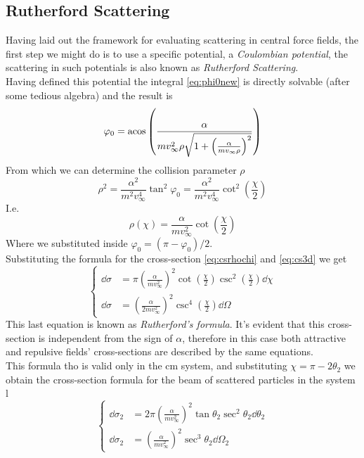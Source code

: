 \documentclass[../admech.tex]{subfiles}
\begin{document}
\subsection{Rutherford Scattering}
Having laid out the framework for evaluating scattering in central force fields, the first step we might do is to use a specific potential, a \emph{Coulombian potential}, the scattering in such potentials is also known as \emph{Rutherford Scattering}.\\
Having defined this potential the integral \eqref{eq:phi0new} is directly solvable (after some tedious algebra) and the result is
\begin{equation}
	\varphi_0=\acos\left( \frac{\alpha}{mv_\infty^2\rho\sqrt{1+\left( \frac{\alpha}{mv_\infty\rho} \right)^2}} \right)
	\label{eq:phi0ruth}
\end{equation}
From which we can determine the collision parameter $\rho$
\begin{equation*}
	\rho^2=\frac{\alpha^2}{m^2v_\infty^4}\tan^2\varphi_0=\frac{\alpha^2}{m^2v_\infty^4}\cot^2\left( \frac{\chi}{2} \right)
\end{equation*}
I.e.
\begin{equation*}
	\rho(\chi)=\frac{\alpha}{mv_\infty^2}\cot\left( \frac{\chi}{2} \right)
	\label{eq:rhoruth}
\end{equation*}
Where we substituted inside $\varphi_0=(\pi-\varphi_0)/2$.\\
Substituting the formula for the cross-section \eqref{eq:csrhochi} and \eqref{eq:cs3d} we get
\begin{equation}
	\left\{ \begin{aligned}
			\dd\sigma&=\pi\left( \frac{\alpha}{mv_\infty^2} \right)^2\cot\left( \frac{\chi}{2} \right)\csc^2\left( \frac{\chi}{2} \right)\dd\chi\\
			\dd\sigma&=\left( \frac{\alpha}{2mv_\infty^2} \right)^2\csc^4\left( \frac{\chi}{2} \right)\dd\Omega
	\end{aligned}\right.
	\label{eq:rutherfordformula}
\end{equation}
This last equation is known as \emph{Rutherford's formula}. It's evident that this cross-section is independent from the sign of $\alpha$, therefore in this case both attractive and repulsive fields' cross-sections are described by the same equations.\\
This formula tho is valid only in the cm system, and substituting $\chi=\pi-2\theta_2$ we obtain the cross-section formula for the beam of scattered particles in the system l
\begin{equation}
	\left\{\begin{aligned}
			\dd\sigma_2&=2\pi\left( \frac{\alpha}{mv_\infty^2} \right)^2\tan\theta_2\sec^2\theta_2\dd\theta_2\\
			\dd\sigma_2&=\left( \frac{\alpha}{mv_\infty^2} \right)^2\sec^3\theta_2\dd\Omega_2
	\end{aligned}\right.
	\label{eq:ruth2l}
\end{equation}
\end{document}
